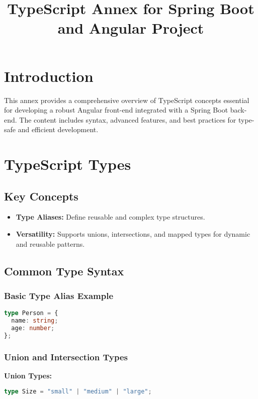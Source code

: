 \documentclass[a4paper,12pt]{article}
\begin{document}
\title{\textbf{TypeScript Annex for Spring Boot and Angular Project}}
\author{}
\date{}
\maketitle

\section*{Introduction}
This annex provides a comprehensive overview of TypeScript concepts essential for developing a robust Angular front-end integrated with a Spring Boot back-end. The content includes syntax, advanced features, and best practices for type-safe and efficient development.

\section{TypeScript Types}
\subsection*{Key Concepts}
\begin{itemize}
    \item \textbf{Type Aliases:} Define reusable and complex type structures.
    \item \textbf{Versatility:} Supports unions, intersections, and mapped types for dynamic and reusable patterns.
\end{itemize}

\subsection*{Common Type Syntax}
\subsubsection*{Basic Type Alias Example}
\begin{lstlisting}[language=TypeScript]
type Person = {
  name: string;
  age: number;
};
\end{lstlisting}

\subsubsection*{Union and Intersection Types}
\textbf{Union Types:}
\begin{lstlisting}[language=TypeScript]
type Size = "small" | "medium" | "large";
\end{lstlisting}
\end{document}
